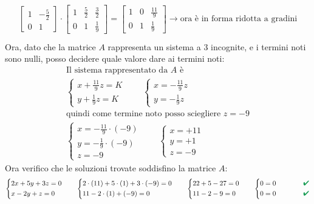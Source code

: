 \documentclass[italian]{article}
\renewcommand{\checkmark}{\textcolor{ForestGreen}{\text{$\qquad$\ding{52}}}}
\begin{document}
\begin{gather*}
\begin{split}
		\begin{bmatrix}
			1 & -\frac{5}{2} \\[2mm]
			0 & 1
		\end{bmatrix}
		\cdot
		\begin{bmatrix}
			1 & \frac{5}{2} & \frac{3}{2} \\[2mm]
			0 & 1 & \frac{1}{9} 
		\end{bmatrix}
		=
		\begin{bmatrix}
			1 & 0 & \frac{11}{9}\\[2mm]
			0 & 1 & \frac{1}{9} 
		\end{bmatrix} \to \text{ora è in forma ridotta a gradini}
	\end{split}\\
\end{gather*}
Ora, dato che la matrice $A$ rappresenta un sistema a 3 incognite, e i termini noti sono nulli, posso decidere quale valore dare ai termini noti:
\begin{gather*}
	\text{Il sistema rappresentato da $A$ è}\\
	\begin{cases*}
		x + \frac{11}{9}z = K \\[2mm]
		y + \frac{1}{9}z = K
	\end{cases*}
	\qquad
	\begin{cases*}
		x = -\frac{11}{9}z\\[2mm]
		y = -\frac{1}{9}z
	\end{cases*}
	\\[2mm]
	\text{quindi come termine noto posso sciegliere $z = -9$}\\
	\begin{cases*}
		x = -\frac{11}{9}\cdot (-9)\\[2mm]
		y = -\frac{1}{9}\cdot (-9) \\[2mm]
		z = -9
	\end{cases*}
	\qquad
	\begin{cases*}
		x = +11\\
		y = +1 \\
		z = -9
	\end{cases*}
\end{gather*}
Ora verifico che le soluzioni trovate soddisfino la matrice $A$:
\begin{gather*}
	\begin{cases*}
		2x + 5y +3z = 0 \\
		x -2y + z = 0
	\end{cases*}
	\qquad
	\begin{cases*}
		2\cdot(11) + 5\cdot(1) + 3\cdot(-9) = 0 \\
		11 -2\cdot(1) + (-9) = 0
	\end{cases*}
	\qquad
	\begin{cases*}
		22 + 5 - 27 = 0 \\
		11 -2 -9 = 0
	\end{cases*}
	\qquad
	\begin{cases*}
		0 = 0 \qquad \checkmark \\
		0 = 0 \qquad \checkmark
	\end{cases*}
\end{gather*}
\end{document}
